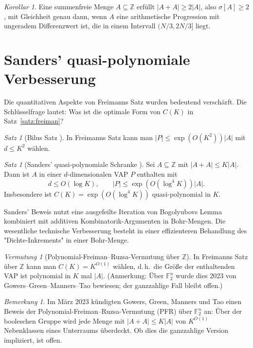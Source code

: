 \documentclass[12pt,a4paper]{amsart}
\theoremstyle{definition}
\theoremstyle{remark}
\newtheorem{satz}[theorem]{Satz}
\newtheorem{vermutung}[theorem]{Vermutung}
\newtheorem{korollar}[theorem]{Korollar}
\newtheorem{bemerkung}[theorem]{Bemerkung}
\newcommand{\F}{\mathbb{F}}
\newcommand{\Z}{\mathbb{Z}}
\begin{document}
\begin{korollar}
Eine summenfreie Menge $A \subseteq \Z$ erfüllt $|A + A| \geq 2|A|$, also
$\sigma[A] \geq 2$, mit Gleichheit genau dann, wenn $A$ eine arithmetische
Progression mit ungeradem Differenzwert ist, die in einem Intervall $(N/3, 2N/3]$
liegt.
\end{korollar}

\section{Sanders' quasi-polynomiale Verbesserung}\label{sec:sanders}

Die quantitativen Aspekte von Freimanns Satz wurden bedeutend verschärft. Die
Schlüsselfrage lautet: Was ist die optimale Form von $C(K)$ in
Satz~\ref{satz:freiman}?

\begin{satz}[Bilus Satz \cite{Bilu1999}]\label{satz:bilu}
In Freimanns Satz kann man $|P| \leq \exp(O(K^2)) |A|$ mit $d \leq K^2$ wählen.
\end{satz}

\begin{satz}[Sanders' quasi-polynomiale Schranke \cite{Sanders2012}]\label{satz:sanders}
Sei $A \subseteq \Z$ mit $|A + A| \leq K|A|$. Dann ist $A$ in einer
$d$-dimensionalen VAP $P$ enthalten mit
\[
  d \leq O(\log K), \qquad |P| \leq \exp(O(\log^4 K)) |A|.
\]
Insbesondere ist $C(K) = \exp(O(\log^4 K))$ quasi-polynomial in $K$.
\end{satz}

Sanders' Beweis nutzt eine ausgefeilte Iteration von Bogolyubovs Lemma kombiniert
mit additiven Kombinatorik-Argumenten in Bohr-Mengen. Die wesentliche technische
Verbesserung besteht in einer effizienteren Behandlung des "Dichte-Inkrements"
in einer Bohr-Menge.

\begin{vermutung}[Polynomial-Freiman--Ruzsa-Vermutung über $\Z$]\label{verm:pfr}
In Freimanns Satz über $\Z$ kann man $C(K) = K^{O(1)}$ wählen, d.\,h.\ die Größe der
enthaltenden VAP ist polynomial in $K$ mal $|A|$. (Anmerkung: Über $\F_2^n$ wurde dies
2023 von Gowers--Green--Manners--Tao bewiesen; der ganzzahlige Fall bleibt offen.)
\end{vermutung}

\begin{bemerkung}
Im März 2023 kündigten Gowers, Green, Manners und Tao \cite{GowersTao2023} einen
Beweis der Polynomial-Freiman--Ruzsa-Vermutung (PFR) über $\F_2^n$ an: Über der
booleschen Gruppe wird jede Menge mit $|A+A| \leq K|A|$ von $K^{O(1)}$ Nebenklassen
eines Unterraums überdeckt. Ob dies die ganzzahlige Version impliziert, ist offen.
\end{bemerkung}
\end{document}
